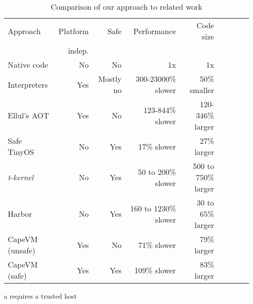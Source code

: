 
\begin{table}
\caption{Comparison of our approach to related work}
\label{tbl-contribution-comparison}
    \begin{threeparttable}
    \begin{tabular}{lrrrrrrrr}
    \toprule
    Approach        & Platform    & Safe               & Performance           & Code size              \\
                    & indep.      &                    &                       & \\
    \midrule
    \midrule
    Native code     & No          & No                 & 1x                    & 1x                     \\
    Interpreters    & Yes         & Mostly no          & 300-23000\% slower    & ~50\% smaller          \\
    Ellul's AOT     & Yes         & No                 & 123-844\% slower      & 120-346\% larger       \\
    Safe TinyOS     & No          & Yes\tnote{a}       & 17\% slower           & 27\% larger            \\
    \emph{t-kernel} & No          & Yes                & 50 to 200\% slower    & 500 to 750\% larger    \\
    Harbor          & No          & Yes                & 160 to 1230\% slower  & 30 to 65\% larger      \\
    CapeVM (unsafe) & Yes         & No                 & 71\% slower           & 79\% larger            \\ %
    CapeVM (safe)   & Yes         & Yes                & 109\% slower          & 83\% larger            \\ %
    \bottomrule
    \end{tabular}
    \begin{tablenotes}
        \item[a] requires a trusted host
    \end{tablenotes}
    \end{threeparttable}
\end{table}
